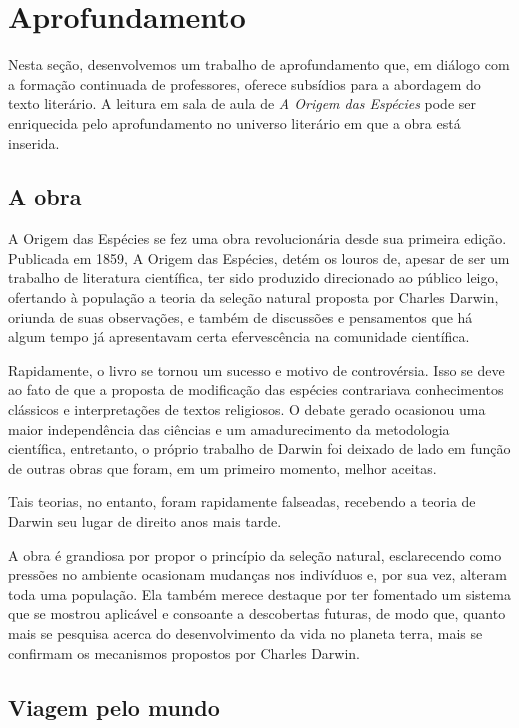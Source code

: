 \documentclass[11pt]{extarticle}
\begin{document}
\section{Aprofundamento}

Nesta seção, desenvolvemos um trabalho de aprofundamento que, em diálogo com
a formação continuada de professores, oferece subsídios para a abordagem do
texto literário. A leitura em sala de aula de \emph{A Origem das Espécies} pode
ser enriquecida pelo aprofundamento no universo literário em que a obra está
inserida.

\subsection{A obra}

A Origem das Espécies se fez uma obra revolucionária desde sua primeira edição.
Publicada em 1859, A Origem das Espécies, detém os louros de, apesar de ser um
trabalho de literatura científica, ter sido produzido direcionado ao público
leigo, ofertando à população a teoria da seleção natural proposta por Charles
Darwin, oriunda de suas observações, e também de discussões e pensamentos que
há algum tempo já apresentavam certa efervescência na comunidade científica.

Rapidamente, o livro se tornou um sucesso e motivo de controvérsia. Isso se
deve ao fato de que a proposta de modificação das espécies contrariava
conhecimentos clássicos e interpretações de textos religiosos. O debate gerado
ocasionou uma maior independência das ciências e um amadurecimento da
metodologia científica, entretanto, o próprio trabalho de Darwin foi deixado de
lado em função de outras obras que foram, em um primeiro momento, melhor
aceitas.

Tais teorias, no entanto, foram rapidamente falseadas, recebendo a teoria de
Darwin seu lugar de direito anos mais tarde.

A obra é grandiosa por propor o princípio da seleção natural, esclarecendo como
pressões no ambiente ocasionam mudanças nos indivíduos e, por sua vez, alteram
toda uma população. Ela também merece destaque por ter fomentado um sistema que
se mostrou aplicável e consoante a descobertas futuras, de modo que, quanto
mais se pesquisa acerca do desenvolvimento da vida no planeta terra, mais se
confirmam os mecanismos propostos por Charles Darwin.


\subsection{Viagem pelo mundo}
\end{document}
